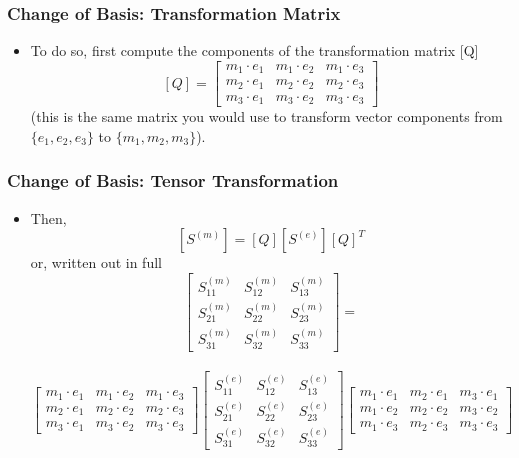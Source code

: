 \documentclass{beamer}
\begin{document}
\begin{frame}
\frametitle{Change of Basis: Transformation Matrix}
\begin{itemize}
    \item To do so, first compute the components of the transformation matrix [Q]
    \[
    [Q] =
    \begin{bmatrix}
        m_1 \cdot e_1 & m_1 \cdot e_2 & m_1 \cdot e_3 \\
        m_2 \cdot e_1 & m_2 \cdot e_2 & m_2 \cdot e_3 \\
        m_3 \cdot e_1 & m_3 \cdot e_2 & m_3 \cdot e_3
    \end{bmatrix}
    \]
    (this is the same matrix you would use to transform vector components from \(\{e_1, e_2, e_3\}\) to \(\{m_1, m_2, m_3\}\)).
\end{itemize}
\end{frame}

\begin{frame}
\frametitle{Change of Basis: Tensor Transformation}
\begin{itemize}
    \item Then,
    \[
    [S^{(m)}] = [Q] [S^{(e)}] [Q]^T
    \]
    or, written out in full
    \tiny
    \[
    \begin{bmatrix}
        S_{11}^{(m)} & S_{12}^{(m)} & S_{13}^{(m)} \\
        S_{21}^{(m)} & S_{22}^{(m)} & S_{23}^{(m)} \\
        S_{31}^{(m)} & S_{32}^{(m)} & S_{33}^{(m)}
    \end{bmatrix} = \]
    \\
    \[
    \begin{bmatrix}
        m_1 \cdot e_1 & m_1 \cdot e_2 & m_1 \cdot e_3 \\
        m_2 \cdot e_1 & m_2 \cdot e_2 & m_2 \cdot e_3 \\
        m_3 \cdot e_1 & m_3 \cdot e_2 & m_3 \cdot e_3
    \end{bmatrix}
    \begin{bmatrix}
        S_{11}^{(e)} & S_{12}^{(e)} & S_{13}^{(e)} \\
        S_{21}^{(e)} & S_{22}^{(e)} & S_{23}^{(e)} \\
        S_{31}^{(e)} & S_{32}^{(e)} & S_{33}^{(e)}
    \end{bmatrix}
    \begin{bmatrix}
        m_1 \cdot e_1 & m_2 \cdot e_1 & m_3 \cdot e_1 \\
        m_1 \cdot e_2 & m_2 \cdot e_2 & m_3 \cdot e_2 \\
        m_1 \cdot e_3 & m_2 \cdot e_3 & m_3 \cdot e_3
    \end{bmatrix}
    \]
\end{itemize}
\end{frame}
\end{document}
